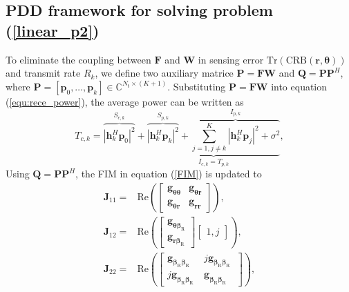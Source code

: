 \documentclass[10pt,journal,twocolumn]{IEEEtran}
\begin{document}
\subsection{PDD framework for solving problem (\ref{linear_p2}) }
To eliminate the coupling between $\mathbf{F}$ and $\mathbf{W}$ in sensing error $\text{Tr}\left(\text{CRB}\left(\mathbf{r},\bm{\theta}\right)\right)$ and transmit rate $R_k$, we define two auxiliary matrice $\mathbf{P}=\mathbf{FW}$ and $\mathbf{Q}=\mathbf{P}\mathbf{P}^H$, where $\mathbf{P}=\left[\mathbf{p}_0,\dots,\mathbf{p}_k\right]\in\mathbb{C}^{N_{\text{t}}\times (K+1)}$. Substituting $\mathbf{P}=\mathbf{FW}$ into equation (\ref{equ:rece_power}), the average power can be written as
\begin{equation}
T_{c,k}=\overbrace{{\left|\mathbf{h}^H_{k}\mathbf{p}_0\right|}^2}^{S_{c,k}}+\underbrace{\overbrace{{\left|\mathbf{h}^H_{k}\mathbf{p}_{k}\right|}^2}^{S_{{p,k}}}+\overbrace{\sum_{j=1,j\neq k}^{K}\left|\mathbf{h}^H_{k}\mathbf{p}_j\right|^2+\sigma^2}^{I_{{p,k}}}}_{I_{c,k}=T_{p,k}},
\label{equ:rece_power2}
\end{equation}
Using $\mathbf{Q}=\mathbf{PP}^H$, the FIM in equation (\ref{FIM}) is updated to 
\begin{subequations}\label{partial_derivative2}
\begin{align}
\mathbf{J}_{11}=& \text{Re}\left(\begin{bmatrix} \mathbf{g}_{\bm{\theta}\bm{\theta}} & \mathbf{g}_{\bm{\theta}\bm{r}} \\ \mathbf{g}_{\bm{\theta}\bm{r}} & {\mathbf{g}_{\bm{r}\bm{r}}} \end{bmatrix}\right),\\
\mathbf{J}_{12}=&\text{Re}\left(\begin{bmatrix} \mathbf{g}_{\bm{\theta}\bm{\beta}_\text{R}}  \\ \mathbf{g}_{\bm{r}\bm{\beta}_\text{R}}  \end{bmatrix}\begin{bmatrix}1,j\end{bmatrix}\right),\\
\mathbf{J}_{22}=&\text{Re}\left(\begin{bmatrix} \mathbf{g}_{\bm{\beta}_\text{R}\bm{\beta}_\text{R}}& j\mathbf{g}_{\bm{\beta}_\text{R}\bm{\beta}_\text{R}}\ \\ j\mathbf{g}_{\bm{\beta}_\text{R}\bm{\beta}_\text{R}}\ & \mathbf{g}_{\bm{\beta}_\text{R}\bm{\beta}_\text{R}}\ \end{bmatrix}\right),
\end{align}
\end{subequations}
\end{document}

